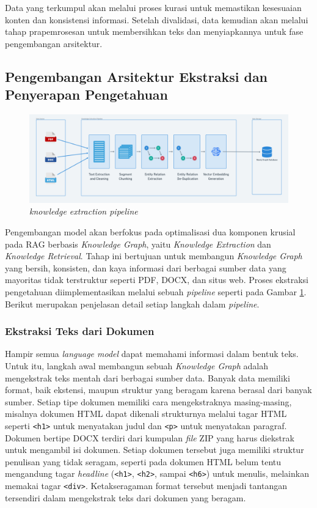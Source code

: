 Data yang terkumpul akan melalui proses kurasi untuk memastikan kesesuaian konten dan konsistensi informasi.
Setelah divalidasi, data kemudian akan melalui tahap prapemrosesan untuk membersihkan teks dan menyiapkannya untuk fase pengembangan arsitektur.

\subsection{Pengembangan Arsitektur Ekstraksi dan Penyerapan Pengetahuan}

\begin{figure}[H]
	\centering
	\includegraphics[width=1\textwidth]{images/knowledge-extraction-flow.png}
	\caption{
		\textit{knowledge extraction pipeline}
	}
	\label{fig:knowledge-extraction-pipeline}
\end{figure}

Pengembangan model akan berfokus pada optimalisasi dua komponen krusial pada RAG berbasis \textit{Knowledge Graph}, yaitu \textit{Knowledge Extraction} dan \textit{Knowledge Retrieval}.
Tahap ini bertujuan untuk membangun \textit{Knowledge Graph} yang bersih, konsisten, dan kaya informasi dari berbagai sumber data yang mayoritas tidak terstruktur seperti PDF, DOCX, dan situs web.
Proses ekstraksi pengetahuan diimplementasikan melalui sebuah \textit{pipeline} seperti pada Gambar \ref{fig:knowledge-extraction-pipeline}.
Berikut merupakan penjelasan detail setiap langkah dalam \textit{pipeline}.

\subsubsection{Ekstraksi Teks dari Dokumen}
Hampir semua \textit{language model} dapat memahami informasi dalam bentuk teks.
Untuk itu, langkah awal membangun sebuah \textit{Knowledge Graph} adalah mengekstrak teks mentah dari berbagai sumber data.
Banyak data memiliki format, baik ekstensi, maupun struktur yang beragam karena berasal dari banyak sumber.
Setiap tipe dokumen memiliki cara mengekstraknya masing-masing, misalnya dokumen HTML dapat dikenali strukturnya melalui tagar HTML seperti \texttt{<h1>} untuk menyatakan judul dan \texttt{<p>} untuk menyatakan paragraf.
Dokumen bertipe DOCX terdiri dari kumpulan \textit{file} ZIP yang harus diekstrak untuk mengambil isi dokumen.
Setiap dokumen tersebut juga memiliki struktur penulisan yang tidak seragam, seperti pada dokumen HTML belum tentu mengandung tagar \textit{headline} (\texttt{<h1>}, \texttt{<h2>}, sampai \texttt{<h6>}) untuk menulis, melainkan memakai tagar \texttt{<div>}.
Ketakseragaman format tersebut menjadi tantangan tersendiri dalam mengekstrak teks dari dokumen yang beragam.

